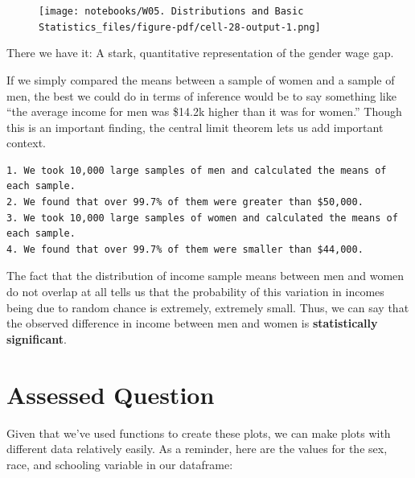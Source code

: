 \documentclass[
  letterpaper,
  DIV=11,
  numbers=noendperiod]{scrreprt}
\begin{document}
\begin{figure}[H]

{\centering \texttt{[image: notebooks/W05. Distributions and Basic Statistics\_files/figure-pdf/cell-28-output-1.png]}

}

\end{figure}

There we have it: A stark, quantitative representation of the gender
wage gap.

If we simply compared the means between a sample of women and a sample
of men, the best we could do in terms of inference would be to say
something like ``the average income for men was \$14.2k higher than it
was for women.'' Though this is an important finding, the central limit
theorem lets us add important context.

\begin{verbatim}
1. We took 10,000 large samples of men and calculated the means of each sample.
2. We found that over 99.7% of them were greater than $50,000. 
3. We took 10,000 large samples of women and calculated the means of each sample.
4. We found that over 99.7% of them were smaller than $44,000.
\end{verbatim}

The fact that the distribution of income sample means between men and
women do not overlap at all tells us that the probability of this
variation in incomes being due to random chance is extremely, extremely
small. Thus, we can say that the observed difference in income between
men and women is \textbf{statistically significant}.


\hypertarget{assessed-question-4}{%
\chapter{Assessed Question}\label{assessed-question-4}}

Given that we've used functions to create these plots, we can make plots
with different data relatively easily. As a reminder, here are the
values for the sex, race, and schooling variable in our dataframe:
\end{document}
